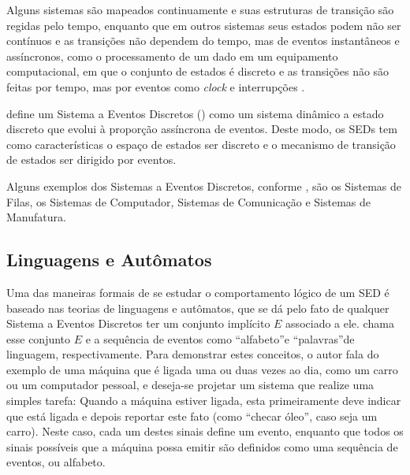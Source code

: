 Alguns sistemas são mapeados continuamente e suas estruturas de transição são regidas pelo tempo, 
enquanto que em outros sistemas seus estados podem não ser contínuos e as transições não dependem do tempo, mas de 
eventos instantâneos e assíncronos, como o processamento de um dado em um equipamento computacional, em que o conjunto de estados é 
discreto e as transições não são feitas por tempo, mas por eventos como \textit{clock} e interrupções 
\cite{teixeira}. 


 define um Sistema a Eventos Discretos () 
como um sistema dinâmico a estado discreto que evolui à proporção assíncrona de eventos. 
Deste modo, os SEDs tem como características o espaço de estados ser discreto e o mecanismo de transição de estados ser 
dirigido por eventos.

Alguns exemplos dos Sistemas a Eventos Discretos, conforme , são os Sistemas de Filas, os Sistemas 
de Computador, Sistemas de Comunicação e Sistemas de Manufatura. 

\subsection{Linguagens e Autômatos}


Uma das maneiras formais de se estudar o comportamento lógico de um SED é baseado nas teorias de linguagens e autômatos, que se dá pelo 
fato de qualquer Sistema a Eventos Discretos ter um conjunto implícito $E$ associado a ele.  chama esse 
conjunto $E$ e a sequência de eventos como 
\textquotedblleft alfabeto\textquotedblright e \textquotedblleft palavras\textquotedblright de linguagem, respectivamente. Para 
demonstrar estes conceitos, o autor fala do exemplo de uma máquina que é ligada uma ou duas vezes ao dia, como um carro ou um computador 
pessoal, e deseja-se projetar um sistema que realize uma simples tarefa: Quando a máquina estiver ligada, esta primeiramente deve 
indicar que está ligada e depois reportar este fato (como \textquotedblleft checar óleo\textquotedblright, caso seja um 
carro). Neste caso, cada um destes sinais define um evento, enquanto que todos os sinais possíveis que a máquina possa emitir são 
definidos como uma sequência de eventos, ou alfabeto.

